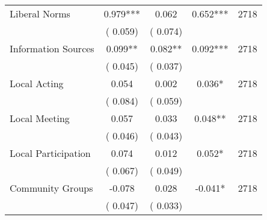 \begin{tabular}{l*{4}{c}}
 Liberal Norms &              0.979*** &         0.062 &           0.652*** & 2718                       \\  
                 &        (       0.059)                   &        (       0.074)                        &                                                             &                                                      \\      

 Information Sources &              0.099** &         0.082** &           0.092*** & 2718                       \\  
                 &        (       0.045)                   &        (       0.037)                        &                                                             &                                                      \\      

 Local Acting &              0.054 &         0.002 &           0.036* & 2718                       \\  
                 &        (       0.084)                   &        (       0.059)                        &                                                             &                                                      \\      

 Local Meeting &              0.057 &         0.033 &           0.048** & 2718                       \\  
                 &        (       0.046)                   &        (       0.043)                        &                                                             &                                                      \\      

 Local Participation &              0.074 &         0.012 &           0.052* & 2718                       \\  
                 &        (       0.067)                   &        (       0.049)                        &                                                             &                                                      \\      

 Community Groups &             -0.078 &         0.028 &          -0.041* & 2718                       \\  
                 &        (       0.047)                   &        (       0.033)                        &                                                             &                                                      \\      

\hline \end{tabular}                                                                                                              
